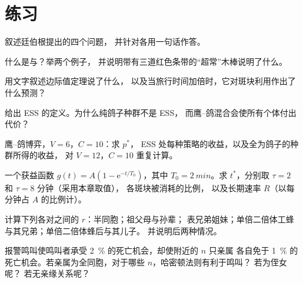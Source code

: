 \section{练习}

\begin{exercise}[$\star$]\label{exo:b3:behavioural-ecology:1}
叙述廷伯根提出的四个问题，
并针对各用一句话作答。
\end{exercise}

\begin{exercise}[$\star$]\label{exo:b3:behavioural-ecology:2}
什么是与？举两个例子，
并说明带有三道红色条带的“超常”木棒说明了什么。
\end{exercise}

\begin{exercise}[$\star$]\label{exo:b3:behavioural-ecology:3}
用文字叙述边际值定理说了什么，
以及当旅行时间加倍时，它对斑块利用作出了什么预测？
\end{exercise}

\begin{exercise}[$\star$]\label{exo:b3:behavioural-ecology:4}
给出 ESS 的定义。为什么纯鸽子种群不是 ESS，
而鹰–鸽混合会使所有个体付出代价？
\end{exercise}

\begin{exercise}[$\star\star$]\label{exo:b3:behavioural-ecology:5}
鹰–鸽博弈，$V = 6$，$C = 10$：求 $p^{*}$，
ESS 处每种策略的收益，以及全为鸽子的种群所得的收益，
对 $V = 12$，$C = 10$ 重复计算。
\end{exercise}

\begin{exercise}[$\star\star$]\label{exo:b3:behavioural-ecology:6}
一个获益函数 $g(t) = A(1 - \mathrm{e}^{-t/T_{0}})$，其中 $T_{0} =
\qty{2}{min}$。求 $t^{*}$，分别取 $\tau = 2$ 和 $\tau = 8$ 分钟（采用本章取值），
各斑块被消耗的比例，
以及长期速率 $R$（以每分钟占 $A$ 的比例计）。
\end{exercise}

\begin{exercise}[$\star\star$]\label{exo:b3:behavioural-ecology:7}
计算下列各对之间的 $r$：半同胞；祖父母与孙辈；
表兄弟姐妹；单倍二倍体工蜂与其兄弟；单倍二倍体蜂后与其儿子。
并说明后两种情况。
\end{exercise}

\begin{exercise}[$\star\star$]\label{exo:b3:behavioural-ecology:8}
报警鸣叫使鸣叫者承受 \qty{2}{\%} 的死亡机会，却使附近的 $n$ 只亲属
各自免于 \qty{1}{\%} 的死亡机会。若亲属为全同胞，对于哪些 $n$，哈密顿法则有利于鸣叫？
若为侄女呢？
若无亲缘关系呢？
\end{exercise}

